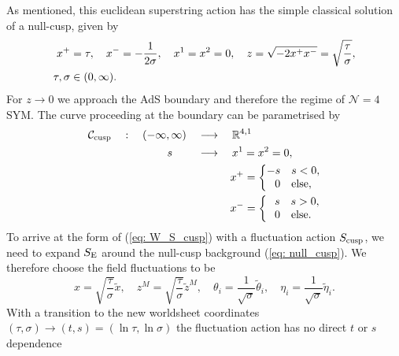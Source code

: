 %
%
As mentioned, this euclidean superstring action has the simple classical solution of a null-cusp, given by
%
%
\begin{align}
x^{+}&=\tau, \quad x^{-}=-\frac{1}{2\sigma}, \quad x^{1}=x^{2}=0, \quad z=\sqrt{-2x^{+}x^{-}}=\sqrt{\frac{\tau}{\sigma}},\label{eq: null_cusp} \\
\tau,\sigma &\in (0,\infty). \notag
\end{align}
%
%
For $z\to 0$ we approach the AdS boundary and therefore the regime of $\mathcal{N}=4$ SYM. The curve proceeding at the boundary can be parametrised by
%
%
\begin{align}
\mathcal{C}_{\rm cusp}\quad :\quad (-\infty,\infty) \quad &\longrightarrow \quad \mathbb{R}^{4,1} \notag \\
%
s\qquad \; &\longrightarrow  \quad x^{1}=x^{2}=0, \\
&\qquad \quad x^{+}=\left\lbrace 
\begin{matrix}
-s\quad s<0, \\ 
0\quad {\rm else,}
\end{matrix} \right. \notag \\
&\qquad \quad x^{-}=\left\lbrace 
\begin{matrix}
\;\;\, s\quad s>0, \\ 
0\quad {\rm else.}
\end{matrix} \right. \notag
\end{align}
%
%
To arrive at the form of (\ref{eq: W_S_cusp}) with a fluctuation action $S_{\rm cusp}$, we need to expand $S_{\rm E}$ around the null-cusp background (\ref{eq: null_cusp}). We therefore choose the field fluctuations to be
%
%
\begin{equation}
x=\sqrt{\frac{\tau}{\sigma}}\tilde{x}, \quad z^{M}=\sqrt{\frac{\tau}{\sigma}}\tilde{z}^{M}, \quad \theta_{i}=\frac{1}{\sqrt{\sigma}}\tilde{\theta}_{i}, \quad \eta_{i} = \frac{1}{\sqrt{\sigma}}\tilde{\eta}_{i}.
\end{equation}
%
%
With a transition to the new worldsheet coordinates ${(\tau,\sigma)\to (t,s)=(\ln\tau , \ln \sigma)}$ the fluctuation action has no direct $t$ or $s$ dependence
%
%
